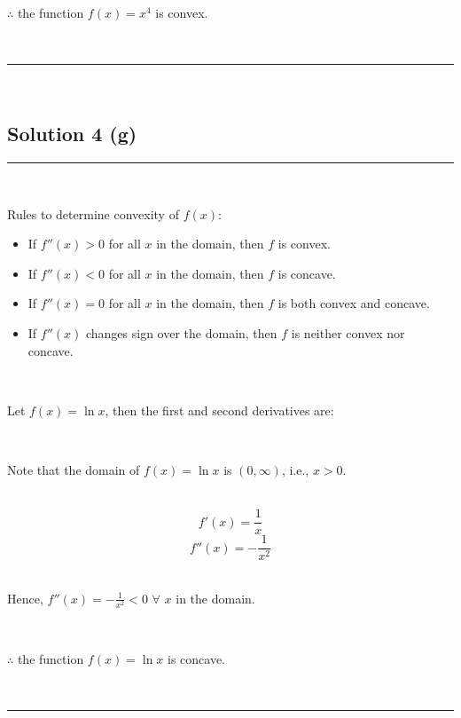 \documentclass{article}
\begin{document}
\parbox{\textwidth}{
$\therefore$ the function $f(x) = x^4$ is convex.
}\\

\noindent\rule{\textwidth}{0.4pt}\\

\newpage

\subsection*{Solution 4 (g)}
\noindent\rule{\textwidth}{0.4pt}\\

\parbox{\textwidth}{
Rules to determine convexity of $f(x)$:
\begin{itemize}
    \item If $f''(x) > 0$ for all $x$ in the domain, then $f$ is convex.
    \item If $f''(x) < 0$ for all $x$ in the domain, then $f$ is concave.
    \item If $f''(x) = 0$ for all $x$ in the domain, then $f$ is both convex and concave.
    \item If $f''(x)$ changes sign over the domain, then $f$ is neither convex nor concave.
\end{itemize}
}\\

\parbox{\textwidth}{
Let $f(x) = \ln x$, then the first and second derivatives are:
}\\

\parbox{\textwidth}{
Note that the domain of $f(x) = \ln x$ is $(0, \infty)$, i.e., $x > 0$.
}\\

$$f'(x) = \frac{1}{x}$$
$$f''(x) = -\frac{1}{x^2}$$\\

\parbox{\textwidth}{
Hence, $f''(x) = -\frac{1}{x^2} < 0$ $\forall$ $x$ in the domain.
}\\

\parbox{\textwidth}{
$\therefore$ the function $f(x) = \ln x$ is concave.
}\\

\noindent\rule{\textwidth}{0.4pt}\\
\end{document}
